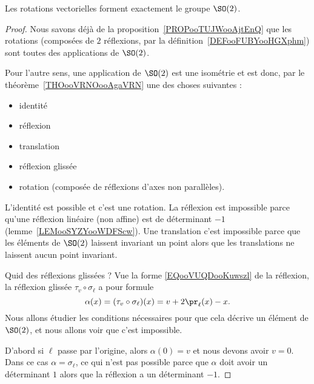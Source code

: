 \begin{corollary} \label{CORooVYUJooDbkIFY}
    Les rotations vectorielles forment exactement le groupe \( \SO(2)\).
\end{corollary}

\begin{proof}
    Nous savons déjà de la proposition~\ref{PROPooTUJWooAjtEnQ} que les rotations (composées de \( 2\) réflexions, par la définition~\ref{DEFooFUBYooHGXphm}) sont toutes des applications de \( \SO(2)\).

    Pour l'autre sens, une application de \( \SO(2)\) est une isométrie et est donc, par le théorème~\ref{THOooVRNOooAgaVRN} une des choses suivantes :
    \begin{itemize}
        \item identité
        \item réflexion
        \item translation
        \item réflexion glissée
        \item rotation (composée de réflexions d'axes non parallèles).
    \end{itemize}
    L'identité est possible et c'est une rotation. La réflexion est impossible parce qu'une réflexion linéaire (non affine) est de déterminant \( -1\) (lemme~\ref{LEMooSYZYooWDFScw}). Une translation c'est impossible parce que les éléments de \( \SO(2)\) laissent invariant un point alors que les translations ne laissent aucun point invariant.

    Quid des réflexions glissées ? Vue la forme \eqref{EQooVUQDooKuwszl} de la réflexion, la réflexion glissée \( \tau_v\circ \sigma_{\ell}\) a pour formule
    \begin{equation}
        \alpha(x)=(\tau_v\circ\sigma_{\ell})(x)=v+2\pr_{\ell}(x)-x.
    \end{equation}
    Nous allons étudier les conditions nécessaires pour que cela décrive un élément de \( \SO(2)\), et nous allons voir que c'est impossible.

    D'abord si \( \ell\) passe par l'origine, alors \( \alpha(0)=v\) et nous devons avoir \( v=0\). Dans ce cas \( \alpha=\sigma_{\ell}\), ce qui n'est pas possible parce que \( \alpha\) doit avoir un déterminant \( 1\) alors que la réflexion a un déterminant \( -1\).


\end{proof}
